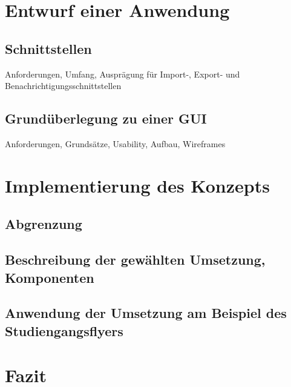 \documentclass[11pt,a4paper]{article}
\begin{document}
\section{Entwurf einer Anwendung}

\subsection{Schnittstellen}

Anforderungen, Umfang, Ausprägung für Import-, Export- und Benachrichtigungsschnittstellen

\subsection{Grundüberlegung zu einer GUI}

Anforderungen, Grundsätze, Usability, Aufbau, Wireframes

\section{Implementierung des Konzepts}

\subsection{Abgrenzung}
\subsection{Beschreibung der gewählten Umsetzung, Komponenten}

\subsection{Anwendung der Umsetzung am Beispiel des Studiengangsflyers}

\section{Fazit}

\pagebreak


\end{document}
